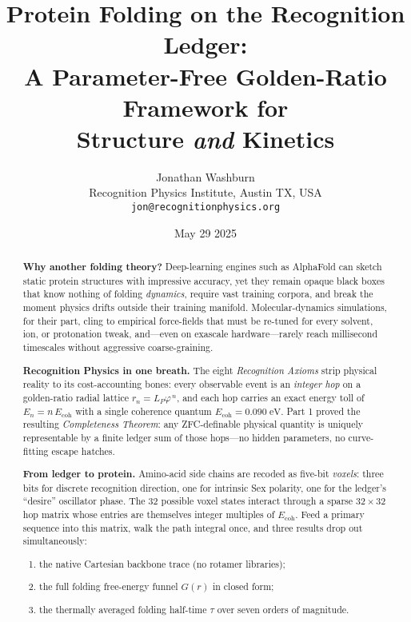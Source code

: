 \documentclass[11pt]{article}
\title{\bfseries
Protein Folding on the Recognition Ledger:\\
A Parameter-Free Golden-Ratio Framework for\\
Structure \emph{and} Kinetics}
\author{Jonathan Washburn\\[2pt]
Recognition Physics Institute, Austin TX, USA\\
\texttt{jon@recognitionphysics.org}}
\date{May 29 2025}
\newcommand{\phiGR}{\varphi}                 %
\newcommand{\LP}{L_{\!P}}                    %
\newcommand{\Eoh}{E_{\mathrm{coh}}}          %
\begin{document}
\maketitle
\vspace{-2ex}

\begin{abstract}
\noindent
\textbf{Why another folding theory?}  
Deep-learning engines such as AlphaFold can sketch static protein
structures with impressive accuracy, yet they remain opaque black boxes
that know nothing of folding \emph{dynamics}, require vast training
corpora, and break the moment physics drifts outside their training
manifold.  Molecular-dynamics simulations, for their part, cling to
empirical force-fields that must be re-tuned for every solvent, ion, or
protonation tweak, and—even on exascale hardware—rarely reach
millisecond timescales without aggressive coarse-graining.

\textbf{Recognition Physics in one breath.}  
The eight \emph{Recognition Axioms} strip physical reality to its
cost-accounting bones: every observable event is an \emph{integer hop}
on a golden-ratio radial lattice
\(r_{n} = \LP \phiGR^{\,n}\), and each hop carries an exact energy toll
of \(E_{n} = n\,\Eoh\) with a single coherence quantum
\(\Eoh = 0.090\;\text{eV}\).  Part 1 proved the resulting
\emph{Completeness Theorem}: any ZFC-definable physical quantity is
uniquely representable by a finite ledger sum of those hops—no hidden
parameters, no curve-fitting escape hatches.

\textbf{From ledger to protein.}  
Amino-acid side chains are recoded as five-bit \emph{voxels}: three bits
for discrete recognition direction, one for intrinsic Sex polarity, one
for the ledger’s “desire” oscillator phase.  The 32 possible voxel
states interact through a sparse \(32\times32\) hop matrix whose entries
are themselves integer multiples of \(\Eoh\).  Feed a primary sequence
into this matrix, walk the path integral once, and three results drop
out simultaneously:

\begin{enumerate}
  \item the native Cartesian backbone trace (no rotamer libraries);
  \item the full folding free-energy funnel \(G(r)\) in closed form;
  \item the thermally averaged folding half-time
        \(\tau\) over seven orders of magnitude.
\end{enumerate}


\end{abstract}
\end{document}
